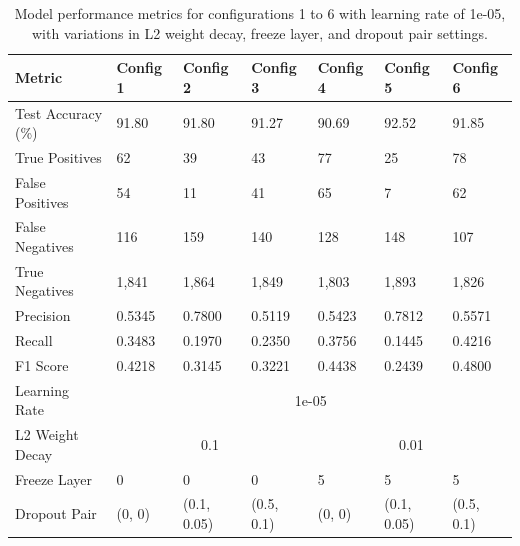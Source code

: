 \begin{table}
\centering
\begin{tabular}{|l|l|l|l|l|l|l|}
\hline
Metric & Config 1 & Config 2 & Config 3 & Config 4 & Config 5 & Config 6 \\ \hline
\hline
Test Accuracy (\%) & 91.80 & 91.80 & 91.27 & 90.69 & 92.52 & 91.85 \\ \hline
True Positives & 62 & 39 & 43 & 77 & 25 & 78 \\ \hline
False Positives & 54 & 11 & 41 & 65 & 7 & 62 \\ \hline
False Negatives & 116 & 159 & 140 & 128 & 148 & 107 \\ \hline
True Negatives & 1,841 & 1,864 & 1,849 & 1,803 & 1,893 & 1,826 \\ \hline
\hline
Precision & 0.5345 & 0.7800 & 0.5119 & 0.5423 & 0.7812 & 0.5571 \\ \hline
Recall & 0.3483 & 0.1970 & 0.2350 & 0.3756 & 0.1445 & 0.4216 \\ \hline
F1 Score & 0.4218 & 0.3145 & 0.3221 & 0.4438 & 0.2439 & 0.4800 \\ \hline
\hline
Learning Rate & \multicolumn{6}{c|}{1e-05} \\ \hline
L2 Weight Decay & \multicolumn{3}{c|}{0.1} & \multicolumn{3}{c|}{0.01} \\ \hline
Freeze Layer & 0 & 0 & 0 & 5 & 5 & 5 \\ \hline
Dropout Pair & (0, 0) & (0.1, 0.05) & (0.5, 0.1) & (0, 0) & (0.1, 0.05) & (0.5, 0.1) \\ \hline

\end{tabular}
\caption{Model performance metrics for configurations 1 to 6 with learning rate of 1e-05, with variations in L2 weight decay, freeze layer, and dropout pair settings.}
\label{tab:initial_gridsearch_1000A}
\end{table}


